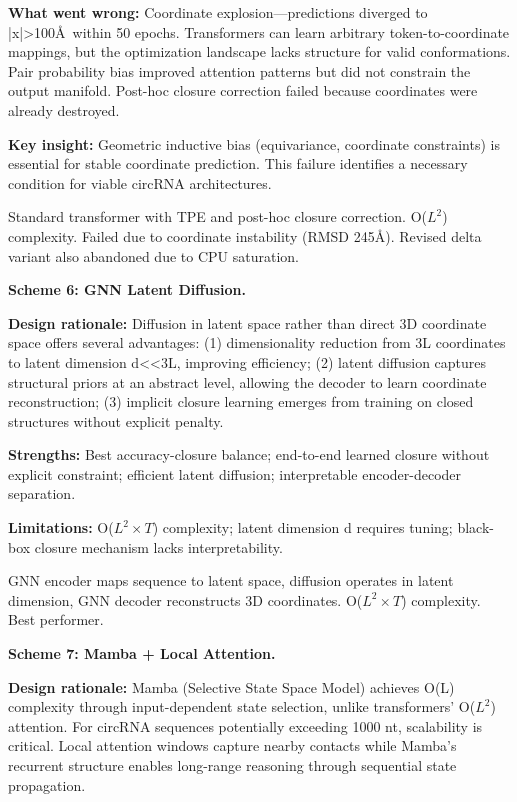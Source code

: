 \documentclass[12pt]{article}
\begin{document}
\textbf{What went wrong:} Coordinate explosion---predictions diverged to |x|>100\AA\ within 50 epochs. Transformers can learn arbitrary token-to-coordinate mappings, but the optimization landscape lacks structure for valid conformations. Pair probability bias improved attention patterns but did not constrain the output manifold. Post-hoc closure correction failed because coordinates were already destroyed.

\textbf{Key insight:} Geometric inductive bias (equivariance, coordinate constraints) is essential for stable coordinate prediction. This failure identifies a necessary condition for viable circRNA architectures.

Standard transformer with TPE and post-hoc closure correction. O($L^2$) complexity. Failed due to coordinate instability (RMSD 245\AA). Revised delta variant also abandoned due to CPU saturation.

\textbf{Scheme 6: GNN Latent Diffusion.}

\textbf{Design rationale:} Diffusion in latent space rather than direct 3D coordinate space offers several advantages: (1) dimensionality reduction from 3L coordinates to latent dimension d<<3L, improving efficiency; (2) latent diffusion captures structural priors at an abstract level, allowing the decoder to learn coordinate reconstruction; (3) implicit closure learning emerges from training on closed structures without explicit penalty.

\textbf{Strengths:} Best accuracy-closure balance; end-to-end learned closure without explicit constraint; efficient latent diffusion; interpretable encoder-decoder separation.

\textbf{Limitations:} O($L^2 \times T$) complexity; latent dimension d requires tuning; black-box closure mechanism lacks interpretability.

GNN encoder maps sequence to latent space, diffusion operates in latent dimension, GNN decoder reconstructs 3D coordinates. O($L^2 \times T$) complexity. Best performer.

\textbf{Scheme 7: Mamba + Local Attention.}

\textbf{Design rationale:} Mamba (Selective State Space Model) \citep{gu2023} achieves O(L) complexity through input-dependent state selection, unlike transformers' O($L^2$) attention. For circRNA sequences potentially exceeding 1000 nt, scalability is critical. Local attention windows capture nearby contacts while Mamba's recurrent structure enables long-range reasoning through sequential state propagation.
\end{document}
